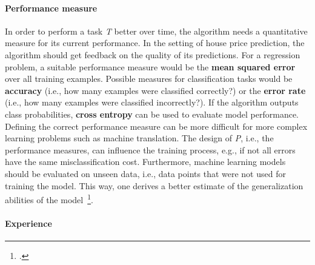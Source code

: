 \paragraph{Performance measure}

In order to perform a task \textit{T} better over time, the algorithm needs
a quantitative measure for its current performance. In the setting of
house price prediction, the algorithm should get feedback on the quality of its
predictions. For a regression problem, a suitable performance measure would be 
the \textbf{mean squared error} over all training examples. Possible measures
for classification tasks would be \textbf{accuracy} (i.e., how many examples
were classified correctly?) or the \textbf{error rate} (i.e., how many
examples were classified incorrectly?). If the algorithm outputs class 
probabilities, \textbf{cross entropy} can be used to evaluate model
performance. Defining the correct performance measure can be more difficult
for more complex learning problems such as machine translation. The design of 
\textit{P}, i.e., the performance measures, can influence the training process, 
e.g., if not all errors have the
same misclassification cost. Furthermore, machine learning models should be evaluated on unseen
data, i.e., data points that were not used for training the model. This way,
one derives a better estimate of the generalization abilities of the model~\footcite{Bishop2006, Goodfellow2016, Mitchell1997}.

\paragraph{Experience}


